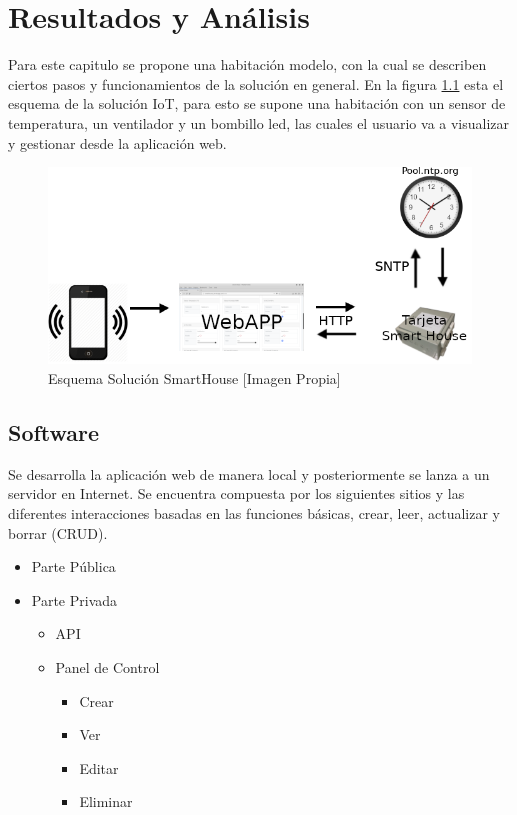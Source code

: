 \chapter{Resultados y Análisis}

Para este capitulo se propone una habitación modelo, con la cual se describen ciertos pasos y funcionamientos de la solución en general. En la figura \ref{fig:iot} esta el esquema de la solución IoT, para esto se supone una habitación con un sensor de temperatura, un ventilador y un bombillo led, las cuales el usuario va a visualizar y gestionar desde la aplicación web.

\begin{figure}[H]
	\centering
	\caption{Esquema Solución SmartHouse [Imagen Propia]}
	\label{fig:iot}
	\includegraphics[width=0.6\linewidth]{Imagenes/IOT}
\end{figure}

\section{Software}

Se desarrolla la aplicación web de manera local y posteriormente se lanza a un servidor en Internet. Se encuentra compuesta por los siguientes sitios y las diferentes interacciones basadas en las funciones básicas, crear, leer, actualizar y borrar (CRUD).

\begin{itemize}
	\item Parte Pública
	\item Parte Privada
	\begin{itemize}
		\item API
		\item Panel de Control
		\begin{itemize}
			\item Crear
			\item Ver
			\item Editar
			\item Eliminar 
		\end{itemize}
	\end{itemize}
\end{itemize}

